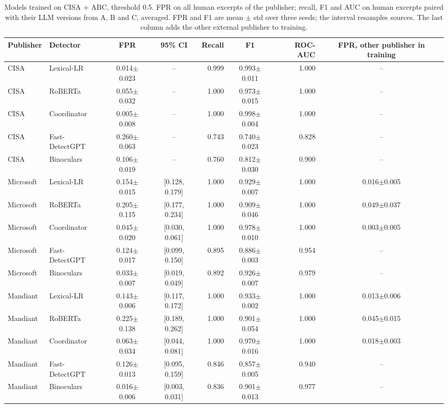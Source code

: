 \begin{table}[t]
\centering
\footnotesize
\caption{Models trained on CISA + ABC, threshold 0.5. FPR on all human excerpts of the publisher; recall, F1 and AUC on human excerpts paired with their LLM versions from A, B and C, averaged. FPR and F1 are mean $\pm$ std over three seeds; the interval resamples sources. The last column adds the other external publisher to training.}
\label{tab:publishers}
\begin{tabular}{llccrcrc}
\toprule
Publisher & Detector & FPR & 95\% CI & Recall & F1 & ROC-AUC & FPR, other publisher in training \\
\midrule
CISA & Lexical-LR & 0.014$\pm$0.023 & -- & 0.999 & 0.993$\pm$0.011 & 1.000 & -- \\
CISA & RoBERTa & 0.055$\pm$0.032 & -- & 1.000 & 0.973$\pm$0.015 & 1.000 & -- \\
CISA & Coordinator & 0.005$\pm$0.008 & -- & 1.000 & 0.998$\pm$0.004 & 1.000 & -- \\
CISA & Fast-DetectGPT & 0.260$\pm$0.063 & -- & 0.743 & 0.740$\pm$0.023 & 0.828 & -- \\
CISA & Binoculars & 0.106$\pm$0.019 & -- & 0.760 & 0.812$\pm$0.030 & 0.900 & -- \\
Microsoft & Lexical-LR & 0.154$\pm$0.015 & [0.128, 0.179] & 1.000 & 0.929$\pm$0.007 & 1.000 & 0.016$\pm$0.005 \\
Microsoft & RoBERTa & 0.205$\pm$0.115 & [0.177, 0.234] & 1.000 & 0.909$\pm$0.046 & 1.000 & 0.049$\pm$0.037 \\
Microsoft & Coordinator & 0.045$\pm$0.020 & [0.030, 0.061] & 1.000 & 0.978$\pm$0.010 & 1.000 & 0.003$\pm$0.005 \\
Microsoft & Fast-DetectGPT & 0.124$\pm$0.017 & [0.099, 0.150] & 0.895 & 0.886$\pm$0.003 & 0.954 & -- \\
Microsoft & Binoculars & 0.033$\pm$0.007 & [0.019, 0.049] & 0.892 & 0.926$\pm$0.007 & 0.979 & -- \\
Mandiant & Lexical-LR & 0.143$\pm$0.006 & [0.117, 0.172] & 1.000 & 0.933$\pm$0.002 & 1.000 & 0.013$\pm$0.006 \\
Mandiant & RoBERTa & 0.225$\pm$0.138 & [0.189, 0.262] & 1.000 & 0.901$\pm$0.054 & 1.000 & 0.045$\pm$0.015 \\
Mandiant & Coordinator & 0.063$\pm$0.034 & [0.044, 0.081] & 1.000 & 0.970$\pm$0.016 & 1.000 & 0.018$\pm$0.003 \\
Mandiant & Fast-DetectGPT & 0.126$\pm$0.013 & [0.095, 0.159] & 0.846 & 0.857$\pm$0.005 & 0.940 & -- \\
Mandiant & Binoculars & 0.016$\pm$0.006 & [0.003, 0.031] & 0.836 & 0.901$\pm$0.013 & 0.977 & -- \\
\bottomrule
\end{tabular}
\end{table}
